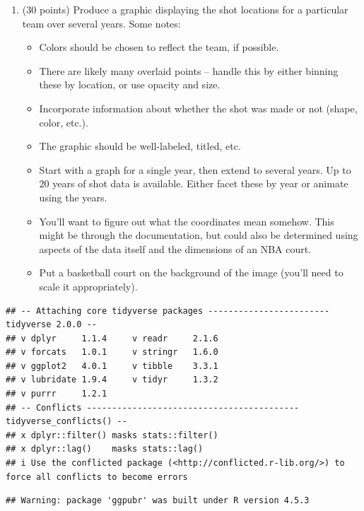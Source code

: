 \documentclass[
]{article}
\providecommand{\tightlist}{%
  \setlength{\itemsep}{0pt}\setlength{\parskip}{0pt}}
\begin{document}
\begin{enumerate}
\def\labelenumi{\arabic{enumi}.}
\item
  (30 points) Produce a graphic displaying the shot locations for a
  particular team over several years. Some notes:

  \begin{itemize}
  \tightlist
  \item
    Colors should be chosen to reflect the team, if possible.
  \item
    There are likely many overlaid points -- handle this by either
    binning these by location, or use opacity and size.
  \item
    Incorporate information about whether the shot was made or not
    (shape, color, etc.).
  \item
    The graphic should be well-labeled, titled, etc.
  \item
    Start with a graph for a single year, then extend to several years.
    Up to 20 years of shot data is available. Either facet these by year
    or animate using the years.
  \item
    You'll want to figure out what the coordinates mean somehow. This
    might be through the documentation, but could also be determined
    using aspects of the data itself and the dimensions of an NBA court.
  \item
    Put a basketball court on the background of the image (you'll need
    to scale it appropriately).
  \end{itemize}
\end{enumerate}

\begin{verbatim}
## -- Attaching core tidyverse packages ------------------------ tidyverse 2.0.0 --
## v dplyr     1.1.4     v readr     2.1.6
## v forcats   1.0.1     v stringr   1.6.0
## v ggplot2   4.0.1     v tibble    3.3.1
## v lubridate 1.9.4     v tidyr     1.3.2
## v purrr     1.2.1     
## -- Conflicts ------------------------------------------ tidyverse_conflicts() --
## x dplyr::filter() masks stats::filter()
## x dplyr::lag()    masks stats::lag()
## i Use the conflicted package (<http://conflicted.r-lib.org/>) to force all conflicts to become errors
\end{verbatim}

\begin{verbatim}
## Warning: package 'ggpubr' was built under R version 4.5.3
\end{verbatim}
\end{document}
